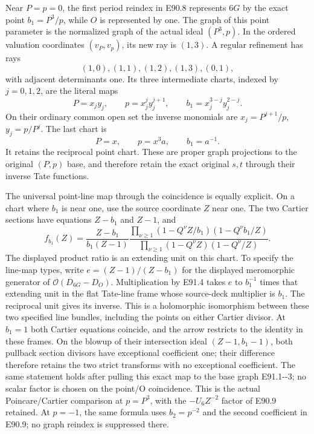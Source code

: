 Near \(P=p=0\), the first period reindex in E90.8
represents \(6G\) by the exact point
\(b_1=P^3/p\), while \(O\) is represented by one.
The graph of this point parameter is the normalized
graph of the actual ideal \((P^3,p)\). In the
ordered valuation coordinates \((v_P,v_p)\), its
new ray is \((1,3)\). A regular refinement has rays
\[
 (1,0),(1,1),(1,2),(1,3),(0,1),
 \tag{E91.1}
\]
with adjacent determinants one. Its three intermediate
charts, indexed by \(j=0,1,2\), are the literal maps
\[
 P=x_jy_j,\qquad p=x_j^j y_j^{j+1},\qquad
 b_1=x_j^{3-j}y_j^{2-j}.
 \tag{E91.2}
\]
On their ordinary common open set the inverse monomials
are \(x_j=P^{j+1}/p\), \(y_j=p/P^j\).
The last chart is
\[
 P=x,\qquad p=x^3a,\qquad b_1=a^{-1}.
 \tag{E91.3}
\]
It retains the reciprocal point chart. These are
proper graph projections to the original \((P,p)\)
base, and therefore retain the exact original
\(s,t\) through their inverse Tate functions.

The universal point-line map through the coincidence
is equally explicit. On a chart where \(b_1\) is
near one, use the source coordinate \(Z\) near one.
The two Cartier sections have equations \(Z-b_1\)
and \(Z-1\), and
\[
 f_{b_1}(Z)=\frac{Z-b_1}{b_1(Z-1)}
       \frac{\prod_{\nu\ge1}(1-Q^\nu Z/b_1)
                              (1-Q^\nu b_1/Z)}
            {\prod_{\nu\ge1}(1-Q^\nu Z)
                              (1-Q^\nu/Z)}.
 \tag{E91.4}
\]
The displayed product ratio is an extending unit
on this chart. To specify the line-map types, write
\(e=(Z-1)/(Z-b_1)\) for the displayed meromorphic
generator of \(\mathcal O(D_{6G}-D_O)\). Multiplication
by E91.4 takes \(e\) to \(b_1^{-1}\) times that
extending unit in the flat Tate-line frame whose
source-deck multiplier is \(b_1\). The reciprocal
unit gives its inverse. This is a holomorphic
isomorphism between these two specified line bundles,
including the points on either Cartier divisor.
At \(b_1=1\) both Cartier equations coincide,
and the arrow restricts to the identity in these
frames. On the blowup of their intersection ideal
\((Z-1,b_1-1)\), both pullback section divisors
have exceptional coefficient one; their difference
therefore retains the two strict transforms with
no exceptional coefficient. The same statement
holds after pulling this exact map to the base
graph E91.1-\/-3; no scalar factor is chosen on the
point/O coincidence.
This is the actual Poincare/Cartier comparison at
\(p=P^3\), with the \(-U_6Z^{-2}\) factor of
E90.9 retained. At \(p=-1\), the same formula
uses \(b_2=p^{-2}\) and the second coefficient
in E90.9; no graph reindex is suppressed there.

